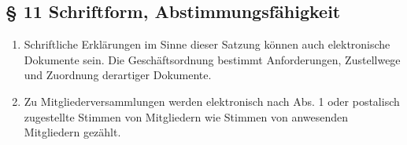 \documentclass[10pt,a4paper]{scrartcl}
\begin{document}
\subsection*{§ 11 Schriftform, Abstimmungsfähigkeit}
\begin{enumerate}
	\item Schriftliche Erklärungen im Sinne dieser Satzung können auch
		elektronische Dokumente sein. Die Geschäftsordnung bestimmt
		Anforderungen, Zustellwege und Zuordnung derartiger Dokumente.
	\item Zu Mitgliederversammlungen werden elektronisch nach Abs. 1 oder
		postalisch zugestellte Stimmen von Mitgliedern wie Stimmen
		von anwesenden Mitgliedern gezählt.
\end{enumerate}
\end{document}
